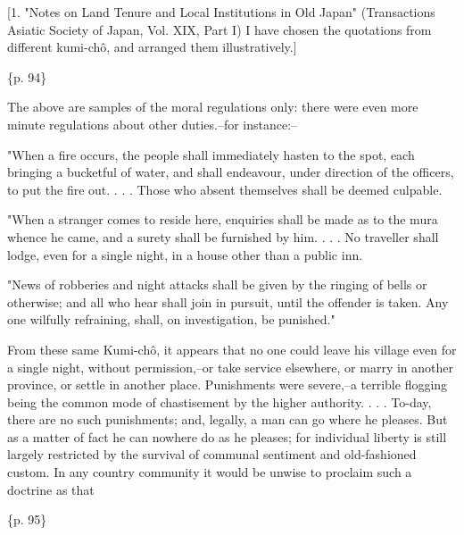 [1. "Notes on Land Tenure and Local Institutions in Old Japan" (Transactions Asiatic Society of Japan, Vol. XIX, Part I) I have chosen the quotations from different kumi-chô, and arranged them illustratively.]

\{p. 94\}

The above are samples of the moral regulations only: there were even more minute regulations about other duties.--for instance:--

"When a fire occurs, the people shall immediately hasten to the spot, each bringing a bucketful of water, and shall endeavour, under direction of the officers, to put the fire out. . . . Those who absent themselves shall be deemed culpable.

"When a stranger comes to reside here, enquiries shall be made as to the mura whence he came, and a surety shall be furnished by him. . . . No traveller shall lodge, even for a single night, in a house other than a public inn.

"News of robberies and night attacks shall be given by the ringing of bells or otherwise; and all who hear shall join in pursuit, until the offender is taken. Any one wilfully refraining, shall, on investigation, be punished."

From these same Kumi-chô, it appears that no one could leave his village even for a single night, without permission,--or take service elsewhere, or marry in another province, or settle in another place. Punishments were severe,--a terrible flogging being the common mode of chastisement by the higher authority. . . . To-day, there are no such punishments; and, legally, a man can go where he pleases. But as a matter of fact he can nowhere do as he pleases; for individual liberty is still largely restricted by the survival of communal sentiment and old-fashioned custom. In any country community it would be unwise to proclaim such a doctrine as that

\{p. 95\}

